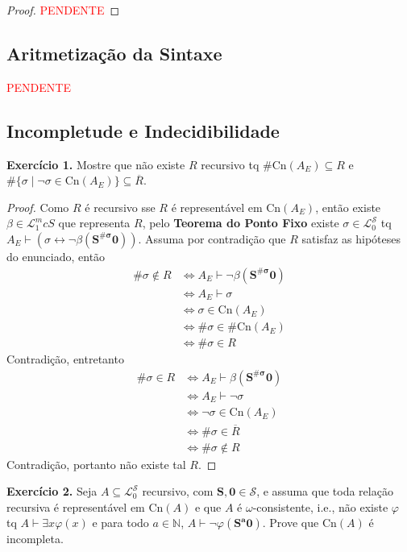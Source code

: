 \documentclass[11pt]{article}
\newcommand{\mc}[1]{\mathcal{#1}}
\newcommand{\mbb}[1]{\mathbb{#1}}
\newcommand{\subs}[2]{
    \setcounter{subsection}{#1 - 1}
    \subsection{#2}
    }
\begin{document}
\begin{proof}
    \textcolor{red}{PENDENTE}
\end{proof}

\subs{4}{Aritmetização da Sintaxe}

\textcolor{red}{PENDENTE}

\subs{5}{Incompletude e Indecidibilidade}

\begin{shaded}
\textbf{Exercício 1.} Mostre que não existe $R$ recursivo tq $\#\text{Cn}(A_E)\subseteq R$ e $\#\{\sigma\mid\neg\sigma\in\text{Cn}(A_E)\}\subseteq\overline{R}$.
\end{shaded}

\begin{proof}
    Como $R$ é recursivo sse $R$ é representável em $\text{Cn}(A_E)$, então existe $\beta\in\mc{L}_1^mc{S}$ que representa $R$, pelo \textbf{Teorema do Ponto Fixo} existe $\sigma\in\mc{L}_0^\mc{S}$ tq $A_E\vdash(\sigma\leftrightarrow\neg\beta(\mathbf{S^{\#\sigma}0}))$. Assuma por contradição que $R$ satisfaz as hipóteses do enunciado, então
    \begin{align*}
        \#\sigma\notin R & \Leftrightarrow A_E\vdash\neg\beta(\mathbf{S^{\#\sigma}0})\\
        & \Leftrightarrow A_E\vdash\sigma\\
        & \Leftrightarrow \sigma\in\text{Cn}(A_E)\\
        & \Leftrightarrow \#\sigma\in\#\text{Cn}(A_E)\\
        & \Leftrightarrow \#\sigma\in R
    \end{align*}
    Contradição, entretanto
    \begin{align*}
        \#\sigma\in R & \Leftrightarrow A_E\vdash\beta(\mathbf{S^{\#\sigma}0})\\
        & \Leftrightarrow A_E\vdash\neg\sigma\\
        & \Leftrightarrow \neg\sigma\in\text{Cn}(A_E)\\
        & \Leftrightarrow \#\sigma\in\overline{R}\\
        & \Leftrightarrow \#\sigma\notin R
    \end{align*}
    Contradição, portanto não existe tal $R$.
\end{proof}

\begin{shaded}
\textbf{Exercício 2.} Seja $A\subseteq\mc{L}_0^\mc{S}$ recursivo, com $\mathbf{S},\mathbf{0}\in\mc{S}$, e assuma que toda relação recursiva é representável em $\text{Cn}(A)$ e que $A$ é $\omega$-consistente, i.e., não existe $\varphi$ tq $A\vdash\exists x\varphi(x)$ e para todo $a\in\mbb{N}$, $A\vdash\neg\varphi(\mathbf{S^a0})$. Prove que $\text{Cn}(A)$ é incompleta.
\end{shaded}
\end{document}
